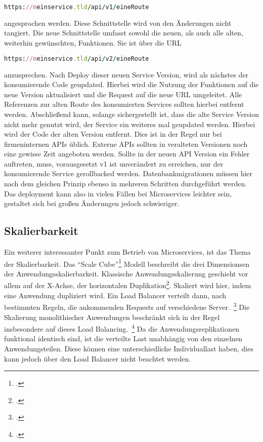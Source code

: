 \begin{lstlisting}[language=Ruby]
https://meinservice.tld/api/v1/eineRoute
\end{lstlisting}

\noindent angesprochen werden. Diese Schnittstelle wird von den Änderungen nicht tangiert. Die neue Schnittstelle umfasst sowohl die neuen, als auch alle alten, weiterhin gewünschten, Funktionen. Sie ist über die URL

\begin{lstlisting}[language=Ruby]
https://meinservice.tld/api/v2/eineRoute
\end{lstlisting}

\noindent anzusprechen. Nach Deploy dieser neuen Service Version, wird als nächstes der konsumierende Code geupdated. Hierbei wird die Nutzung der Funktionen auf die neue Version aktualisiert und die Request auf die neue URL umgeleitet. Alle Referenzen zur alten Route des konsumierten Services sollten hierbei entfernt werden. Abschließend kann, solange sichergestellt ist, dass die alte Service Version nicht mehr genutzt wird, der Service ein weiteres mal geupdated werden. Hierbei wird der Code der alten Version entfernt. Dies ist in der Regel nur bei firmeninternen APIs üblich. Externe APIs sollten in veralteten Versionen noch eine gewisse Zeit angeboten werden. Sollte in der neuen API Version ein Fehler auftreten, muss, vorausgesetzt v1 ist unverändert zu erreichen, nur der konsumierende Service gerollbacked werden. Datenbankmigrationen müssen hier nach dem gleichen Prinzip ebenso in mehreren Schritten durchgeführt werden. Das deployment kann also in vielen Fällen bei Microservices leichter sein, gestaltet sich bei großen Änderungen jedoch schwieriger.

\subsection{Skalierbarkeit}
Ein weiterer interessanter Punkt zum Betrieb von Microservices, ist das Thema der Skalierbarkeit.
Das ``Scale Cube''\footcite[][]{abbott2009art} Modell beschreibt die drei Dimensionsen der Anwendungsskalierbarkeit. Klassische Anwendungsskalierung geschieht vor allem auf der X-Achse, der horizontalen Duplikation\footcite[][]{abbott2009art}. Skaliert wird hier, indem eine Anwendung dupliziert wird. Ein Load Balancer verteilt dann, nach bestimmten Regeln, die ankommenden Requests auf verschiedene Server.~\footcite[vgl.][]{loadbalancing} 
Die Skalierung monolithischer Anwendungen beschränkt sich in der Regel insbesondere auf dieses Load Balancing.~\footcite[vgl.][]{infaktuell} 
Da die Anwendungsreplikationen funktional identisch sind, ist die verteilte Last  unabhängig von den einzelnen Anwendungsteilen. Diese können eine unterschiedliche Individuallast haben, dies kann jedoch über den Load Balancer nicht beachtet werden.

